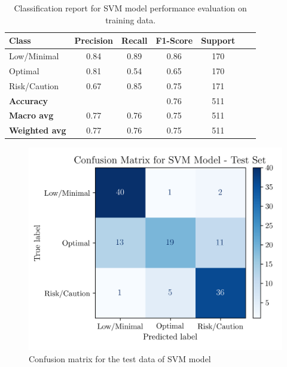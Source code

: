 \documentclass[conference]{IEEEtran}
\begin{document}
\begin{table}[H]
\centering
\caption{Classification report for SVM model performance evaluation on training data.}
\label{crTrainSVM}
\begin{tabular}{lcccccc}
\toprule
\textbf{Class} & \textbf{Precision} & \textbf{Recall} & \textbf{F1-Score} & \textbf{Support} \\
\midrule
Low/Minimal & 0.84 & 0.89 & 0.86 & 170 \\
Optimal & 0.81 & 0.54 & 0.65 & 170 \\
Risk/Caution & 0.67 & 0.85 & 0.75 & 171 \\
\midrule
\textbf{Accuracy} &  &  & 0.76 & 511 \\
\textbf{Macro avg} & 0.77 & 0.76 & 0.75 & 511 \\
\textbf{Weighted avg} & 0.77 & 0.76 & 0.75 & 511 \\
\bottomrule
\end{tabular}
\end{table} %

\begin{figure}[H]
    \centering
    \includegraphics[width=1\linewidth]{assets/SVM_ConfusionMatrixTest.png}
    \caption{Confusion matrix for the test data of SVM model}
    \label{svm_cm_test}
\end{figure} %
\end{document}
